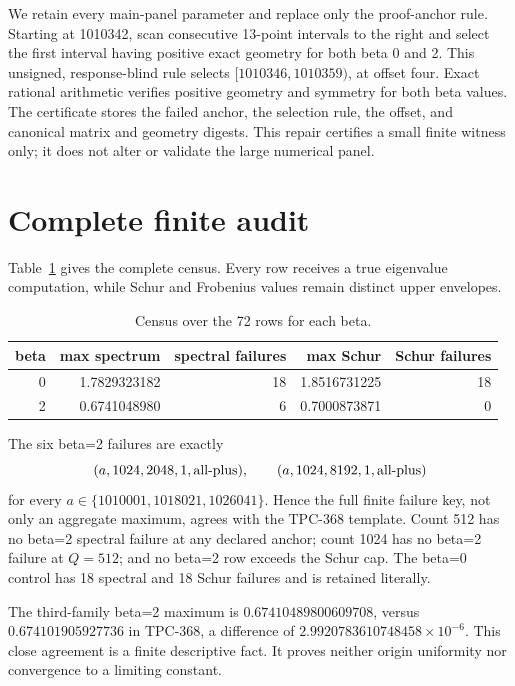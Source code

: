\documentclass[10pt]{article}
\begin{document}
We retain every main-panel parameter and replace only the proof-anchor rule.
Starting at 1010342, scan consecutive 13-point intervals to the right and
select the first interval having positive exact geometry for both beta 0 and
2.  This unsigned, response-blind rule selects
$[1010346,1010359)$, at offset four.  Exact rational arithmetic verifies
positive geometry and symmetry for both beta values.  The certificate stores
the failed anchor, the selection rule, the offset, and canonical matrix and
geometry digests.  This repair certifies a small finite witness only; it does
not alter or validate the large numerical panel.

\section{Complete finite audit}

Table~\ref{tab:beta} gives the complete census.  Every row receives a true
eigenvalue computation, while Schur and Frobenius values remain distinct
upper envelopes.

\begin{table}[t]
\centering
\caption{Census over the 72 rows for each beta.}
\label{tab:beta}
\small
\begin{tabular}{r r r r r}
\toprule
beta & max spectrum & spectral failures & max Schur & Schur failures\\
\midrule
0 & 1.7829323182 & 18 & 1.8516731225 & 18\\
2 & 0.6741048980 & 6 & 0.7000873871 & 0\\
\bottomrule
\end{tabular}
\end{table}

The six beta=2 failures are exactly
\begin{equation*}
(a,1024,2048,1,\mathrm{all\mathchar`-plus}),\qquad
(a,1024,8192,1,\mathrm{all\mathchar`-plus})
\end{equation*}
for every $a\in\{1010001,1018021,1026041\}$.  Hence the full finite failure
key, not only an aggregate maximum, agrees with the TPC-368 template.  Count
512 has no beta=2 spectral failure at any declared anchor; count 1024 has no
beta=2 failure at $Q=512$; and no beta=2 row exceeds the Schur cap.  The
beta=0 control has 18 spectral and 18 Schur failures and is retained literally.

The third-family beta=2 maximum is
$0.67410489800609708$, versus $0.674101905927736$ in TPC-368, a difference
of $2.9920783610748458\times10^{-6}$.  This close agreement is a finite
descriptive fact.  It proves neither origin uniformity nor convergence to a
limiting constant.
\end{document}
